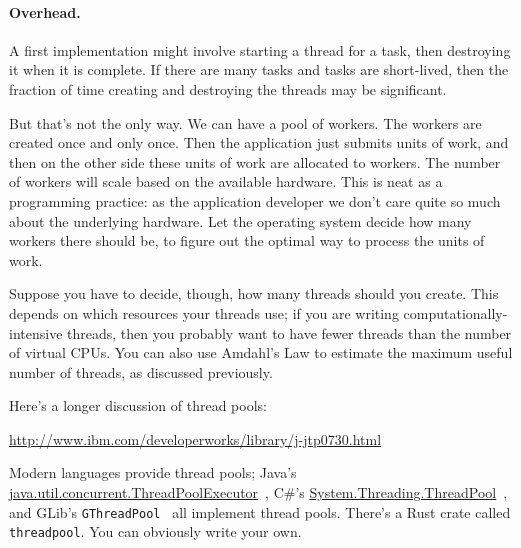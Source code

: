 \paragraph{Overhead.}
A first implementation might involve starting a thread for a task, then destroying it when it is complete. If there are many tasks and tasks are short-lived, then the fraction of time creating and destroying the threads may be significant.

 But that's not the only way. We can have a pool of workers. The workers are created once and only once. Then the application just submits units of work, and then on the other side these units of work are allocated to workers. The number of workers will scale based on the available hardware. This is neat as a programming practice: as the application developer we don't care quite so much about the underlying hardware. Let the operating system decide how many workers there should be, to figure out the optimal way to process the units of work.
 
Suppose you have to decide, though, how many threads should you create.
This depends
on which resources your threads use; if you are writing
computationally-intensive threads, then you probably want to have
fewer threads than the number of virtual CPUs. You can also use
Amdahl's Law to estimate the maximum useful number of threads, as
discussed previously.

Here's a longer discussion of thread pools:

\begin{center}
\url{http://www.ibm.com/developerworks/library/j-jtp0730.html}
\end{center}

Modern languages provide thread pools; Java's
\url{java.util.concurrent.ThreadPoolExecutor}~\cite{java:threadpoolexecutor}, C\#'s
\url{System.Threading.ThreadPool}~\cite{csharp:threadpool}, and GLib's {\tt GThreadPool}~\cite{gnome:threadpool} all implement thread pools. There's a Rust crate called \texttt{threadpool}. You can obviously write your own.

